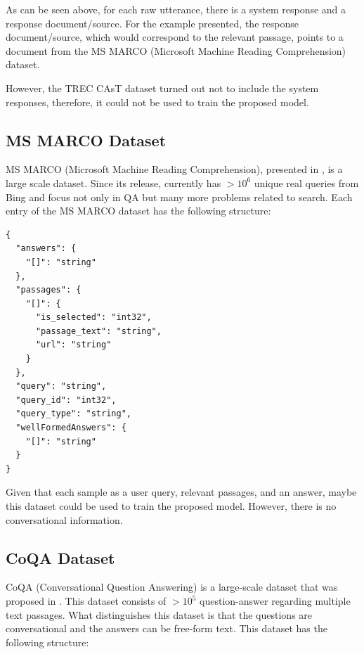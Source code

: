 \documentclass[a4paper, 10pt]{article}
\begin{document}
        As can be seen above, for each raw utterance, there is a system response and a response document/source. For the example presented, the response document/source, which would correspond to the relevant passage, points to a document from the MS MARCO (Microsoft Machine Reading Comprehension) dataset.

        However, the TREC CAsT dataset turned out not to include the system responses, therefore, it could not be used to train the proposed model.

    \subsection{MS MARCO Dataset}

        MS MARCO (Microsoft Machine Reading Comprehension), presented in \cite{Nguyen2016}, is a large scale dataset. Since its release, currently has $>10^6$ unique real queries from Bing and focus not only in QA but many more problems related to search. Each entry of the MS MARCO dataset has the following structure:

        \begin{lstlisting}[style=json]
{
  "answers": {
    "[]": "string"
  },
  "passages": {
    "[]": {
      "is_selected": "int32",
      "passage_text": "string",
      "url": "string"
    }
  },
  "query": "string",
  "query_id": "int32",
  "query_type": "string",
  "wellFormedAnswers": {
    "[]": "string"
  }
}
\end{lstlisting}

        Given that each sample as a user query, relevant passages, and an answer, maybe this dataset could be used to train the proposed model. However, there is no conversational information.

    \subsection{CoQA Dataset}

        CoQA (Conversational Question Answering) is a large-scale dataset that was proposed in \cite{Reddy2019}. This dataset consists of $>10^5$ question-answer regarding multiple text passages. What distinguishes this dataset is that the questions are conversational and the answers can be free-form text. This dataset has the following structure:
        
\end{document}
